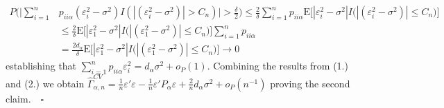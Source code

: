 \documentclass[Research_Module_ES.tex]{subfiles}
\begin{document}
\begin{align*}
P\biggl(\biggl|\sum_{i=1}^n &p_{ii\alpha}(\varepsilon_i^2-\sigma^2)I(|(\varepsilon_i^2-\sigma^2)|> C_n)\biggr|>\frac{\delta}{2}\biggr) \le \frac{2}{\delta}\sum_{i=1}^n p_{ii\alpha}\mathrm{E}\bigl[|\varepsilon_i^2-\sigma^2|I\bigl(|(\varepsilon_i^2-\sigma^2)|\le C_n\bigr)\bigr]\\
&\le  \frac{2}{\delta}\mathrm{E}\bigl[|\varepsilon_1^2-\sigma^2|I\bigl(|(\varepsilon_1^2-\sigma^2)|\le C_n\bigr)\bigr]\sum_{i=1}^n p_{ii\alpha} \\
&=  \frac{2d_\alpha}{\delta}\mathrm{E}\bigl[|\varepsilon_1^2-\sigma^2|I\bigl(|(\varepsilon_1^2-\sigma^2)|\le C_n\bigr)\bigr] \to 0
\end{align*}
establishing that $\sum_{i=1}^n p_{ii\alpha}\varepsilon_i^2= d_\alpha \sigma^2 + o_P(1)$.
Combining the results from (1.) and (2.) we obtain $\hat{\Gamma}_{\alpha,n}^{CV} =\frac{1}{n}\varepsilon'\varepsilon- \frac{1}{n}\varepsilon'P_\alpha\varepsilon + \frac{2}{n}d_\alpha\sigma^2 +o_P(n^{-1})$
proving the second claim.$\quad\square$
\end{document}
